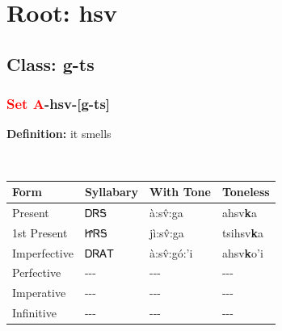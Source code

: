 \needspace{4in}
\section*{Root: hsv}
\nopagebreak
{}
\needspace{3in}
\subsection*{Class: g-ts}
\nopagebreak
\needspace{2in}
\subsubsection*{\textcolor{Red}{Set A}{-}\textbf{hsv}{-}[g-ts]}
\nopagebreak
\textbf{Definition: } it smells
\\[0.5em]
\begin{tabularx}{\textwidth}{l X X X}%
\toprule%
\textbf{Form}&\textbf{Syllabary}&\textbf{With Tone}&\textbf{Toneless}\\%
\midrule%
Present&ᎠᏒᎦ&à:sv̂:ga&ahsv\textbf{k}a\\%
1st Present&ᏥᏒᎦ&jì:sv̂:ga&tsihsv\textbf{k}a\\%
Imperfective&ᎠᏒᎪᎢ&à:sv̂:gó:’i&ahsv\textbf{k}o'i\\%
Perfective&{-}{-}{-}&{-}{-}{-}&{-}{-}{-}\\%
Imperative&{-}{-}{-}&{-}{-}{-}&{-}{-}{-}\\%
Infinitive&{-}{-}{-}&{-}{-}{-}&{-}{-}{-}\\%
\bottomrule%
\end{tabularx}
\\[1em]